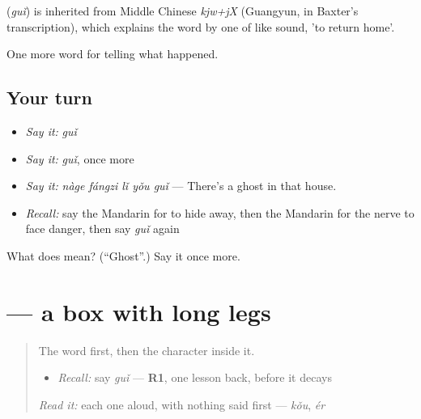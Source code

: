 \begin{cousinweb}
\textbf{} (\emph{guǐ}) is inherited from Middle Chinese \emph{kjw+jX} (Guangyun, in Baxter's transcription), which explains the word by one of like sound, 'to return home'.
\end{cousinweb}

\begin{grammarlens}[title={What you've built}]
One more word for telling what happened.
\end{grammarlens}

\subsection*{Your turn}
\begin{itemize}
\raggedright
  \item \emph{Say it:} \emph{guǐ}
  \item \emph{Say it:} \emph{guǐ}, once more
  \item \emph{Say it:} \emph{nàge fángzi lǐ yǒu guǐ} — There's a ghost in that house.
  \item \emph{Recall:} say the Mandarin for to hide away, then the Mandarin for the nerve to face danger, then say \emph{guǐ} again
\end{itemize}

\begin{tcolorbox}[breakable,colback=teal!4,colframe=teal!35!black,title={Before you move on}]
What does  mean? (\textquotedblleft{}Ghost\textquotedblright{}.) Say it once more.
\end{tcolorbox}
\section[\texorpdfstring{\zh{鬼} (guǐ)}{鬼 (guǐ)}]{ — a box with long legs}

\label{lesson:ZH-W332-gui-ghost}



\begin{quote}
The word first, then the character inside it.

\begin{itemize}
\raggedright
  \item \emph{Recall:} say \emph{guǐ} — \textbf{R1}, one lesson back, before it decays
\end{itemize}

\begin{quote}
 
\end{quote}

\emph{Read it:} each one aloud, with nothing said first — \emph{kǒu}, \emph{ér}
\end{quote}

